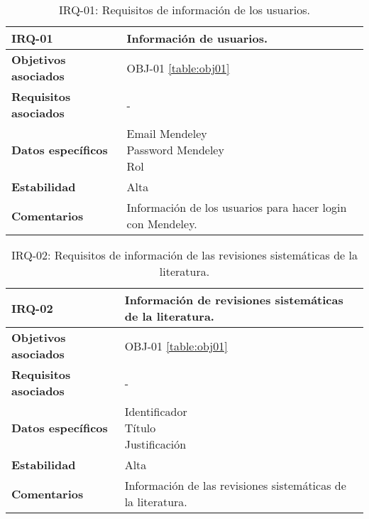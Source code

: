 \begin{table}[!hbt]
	\begin{center}
		\begin{tabular}{|p{5cm}|p{10cm}|}
			\hline
			\textbf{IRQ-01} & Información de usuarios.\\
			\hline
			\textbf{Objetivos asociados} & OBJ-01 \ref{table:obj01}\\
			\hline
			\textbf{Requisitos asociados} & -\\
			\hline
			\textbf{Datos específicos} & \shortstack[l]{Email Mendeley \\ Password Mendeley \\ Rol} \\
			\hline
			\textbf{Estabilidad} & Alta\\
			\hline
			\textbf{Comentarios} & Información de los usuarios para hacer login con Mendeley.\\
			\hline
		\end{tabular}
		\caption{IRQ-01: Requisitos de información de los usuarios.}
		\label{table:irq01}
	\end{center}
\end{table}

\begin{table}[!hbt]
	\begin{center}
		\begin{tabular}{|p{5cm}|p{10cm}|}
			\hline
			\textbf{IRQ-02} & Información de revisiones sistemáticas de la literatura.\\
			\hline
			\textbf{Objetivos asociados} & OBJ-01 \ref{table:obj01}\\
			\hline
			\textbf{Requisitos asociados} & -\\
			\hline
			\textbf{Datos específicos} & \shortstack[l]{Identificador \\ Título \\ Justificación} \\
			\hline
			\textbf{Estabilidad} & Alta\\
			\hline
			\textbf{Comentarios} & Información de las revisiones sistemáticas de la literatura.\\
			\hline
		\end{tabular}
		\caption{IRQ-02: Requisitos de información de las revisiones sistemáticas de la literatura.}
		\label{table:irq02}
	\end{center}
\end{table}

